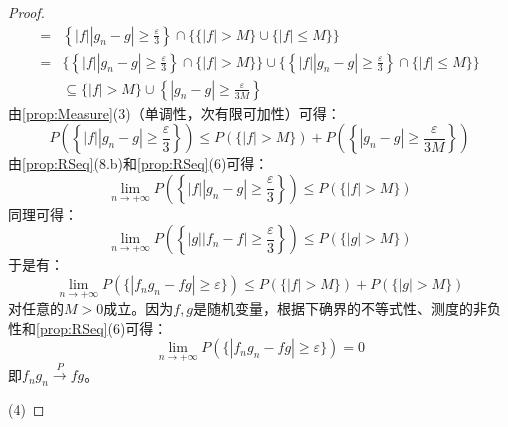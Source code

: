 \begin{proof}
\begin{align*}
		=&\left\{|f||g_n-g|\geqslant\frac{\varepsilon}{3}\right\}\cap\Big\{\{|f|>M\}\cup\{|f|\leqslant M\}\Big\} \\
		=&\Big\{\left\{|f||g_n-g|\geqslant\frac{\varepsilon}{3}\right\}\cap\{|f|>M\}\Big\}\cup\Big\{\left\{|f||g_n-g|\geqslant\frac{\varepsilon}{3}\right\}\cap\{|f|\leqslant M\}\Big\} \\
		&\subseteq\{|f|>M\}\cup\left\{|g_n-g|\geqslant\frac{\varepsilon}{3M}\right\}
	\end{align*}
	由\cref{prop:Measure}(3)（单调性，次有限可加性）可得：
	\begin{equation*}
		P\left(\left\{|f||g_n-g|\geqslant\frac{\varepsilon}{3}\right\}\right)\leqslant P(\{|f|>M\})+P\left(\left\{|g_n-g|\geqslant\frac{\varepsilon}{3M}\right\}\right)
	\end{equation*}
	由\cref{prop:RSeq}(8.b)和\cref{prop:RSeq}(6)可得：
	\begin{equation*}
		\lim_{n\to+\infty}P\left(\left\{|f||g_n-g|\geqslant\frac{\varepsilon}{3}\right\}\right)\leqslant P(\{|f|>M\})
	\end{equation*}
	同理可得：
	\begin{equation*}
		\lim_{n\to+\infty}P\left(\left\{|g||f_n-f|\geqslant\frac{\varepsilon}{3}\right\}\right)\leqslant P(\{|g|>M\})
	\end{equation*}
	于是有：
	\begin{equation*}
		\lim_{n\to+\infty}P(\{|f_ng_n-fg|\geqslant\varepsilon\})\leqslant P(\{|f|>M\})+P(\{|g|>M\})
	\end{equation*}
	对任意的$M>0$成立。因为$f,g$是随机变量，根据下确界的不等式性、测度的非负性和\cref{prop:RSeq}(6)可得：
	\begin{equation*}
		\lim_{n\to+\infty}P(\{|f_ng_n-fg|\geqslant\varepsilon\})=0
	\end{equation*}
	即$f_ng_n\overset{P}{\longrightarrow}fg$。\par
	(4)
\end{proof}
